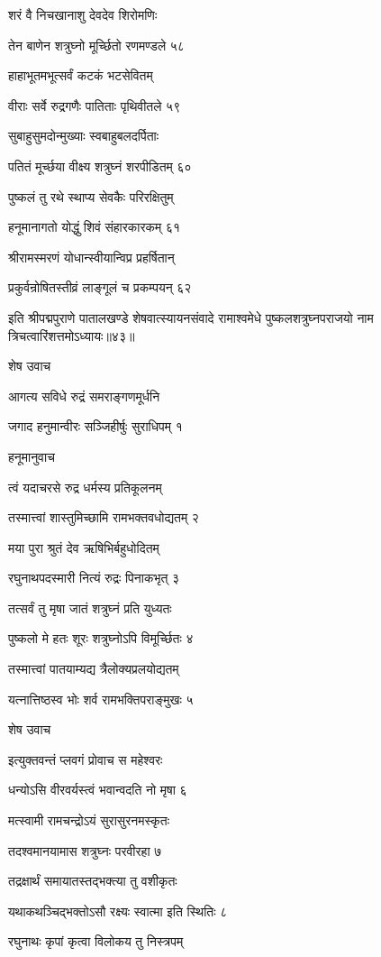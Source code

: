 शरं वै निचखानाशु देवदेव शिरोमणिः

तेन बाणेन शत्रुघ्नो मूर्च्छितो रणमण्डले ५८

हाहाभूतमभूत्सर्वं कटकं भटसेवितम्

वीराः सर्वे रुद्रगणैः पातिताः पृथिवीतले ५९

सुबाहुसुमदोन्मुख्याः स्वबाहुबलदर्पिताः

पतितं मूर्च्छया वीक्ष्य शत्रुघ्नं शरपीडितम् ६०

पुष्कलं तु रथे स्थाप्य सेवकैः परिरक्षितुम्

हनूमानागतो योद्धुं शिवं संहारकारकम् ६१

श्रीरामस्मरणं योधान्स्वीयान्विप्र प्रहर्षितान्

प्रकुर्वन्रोषितस्तीव्रं लाङ्गूलं च प्रकम्पयन् ६२

इति श्रीपद्मपुराणे पातालखण्डे शेषवात्स्यायनसंवादे रामाश्वमेधे पुष्कलशत्रुघ्नपराजयो नाम त्रिचत्वारिंशत्तमोऽध्यायः॥४३॥


शेष उवाच

आगत्य सविधे रुद्रं समराङ्गणमूर्धनि

जगाद हनुमान्वीरः सञ्जिहीर्षुः सुराधिपम् १

हनूमानुवाच

त्वं यदाचरसे रुद्र धर्मस्य प्रतिकूलनम्

तस्मात्त्वां शास्तुमिच्छामि रामभक्तवधोद्यतम् २

मया पुरा श्रुतं देव ऋषिभिर्बहुधोदितम्

रघुनाथपदस्मारी नित्यं रुद्रः पिनाकभृत् ३

तत्सर्वं तु मृषा जातं शत्रुघ्नं प्रति युध्यतः

पुष्कलो मे हतः शूरः शत्रुघ्नोऽपि विमूर्च्छितः ४

तस्मात्त्वां पातयाम्यद्य त्रैलोक्यप्रलयोद्यतम्

यत्नात्तिष्ठस्व भोः शर्व रामभक्तिपराङ्मुखः ५

शेष उवाच

इत्युक्तवन्तं प्लवगं प्रोवाच स महेश्वरः

धन्योऽसि वीरवर्यस्त्वं भवान्वदति नो मृषा ६

मत्स्वामी रामचन्द्रोऽयं सुरासुरनमस्कृतः

तदश्वमानयामास शत्रुघ्नः परवीरहा ७

तद्रक्षार्थं समायातस्तद्भक्त्या तु वशीकृतः

यथाकथञ्चिद्भक्तोऽसौ रक्ष्यः स्वात्मा इति स्थितिः ८

रघुनाथः कृपां कृत्वा विलोकय तु निस्त्रपम्

